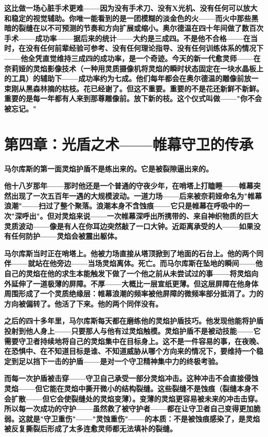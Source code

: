 \documentclass[12pt,a4paper,openany]{ctexbook}
\begin{document}
\textbf{这比做一场心脏手术更难——因为没有手术刀、没有X光机、没有任何可以放大和稳定的视觉辅助。你唯一能看到的是一团模糊的淡金色的火——而火中那些黑暗的裂缝在以不可预测的节奏和方向扩展或缩小。奥尔德温在四十年间做了数百次手术——成功率——据后来的统计——大约是三成四。不是他不合格——在当时，在没有任何前辈经验可参考、没有任何理论指导、没有任何训练体系的情况下——他全凭直觉维持三成四的成功率，是一个奇迹。今天的新一代愈灵师——在奈莉娅的灵焰影像技术（一种用灵质摄像机将灵焰的瞬时状态固定在一块水晶板上的工具）的辅助下——成功率约为七成。他们每年都会在奥尔德温的雕像前放一束刚从黑森林摘的枯枝。花已经谢了。但这不重要。重要的不是花还新鲜不新鲜。重要的是每一年都有人来到那尊雕像前。放下新的枝。这个仪式叫做——"你不会被忘记。"}


\section*{第四章：光盾之术——帷幕守卫的传承}


\textbf{马尔库斯的第一面灵焰护盾不是练出来的。它是被裂隙逼出来的。}


\textbf{他十八岁那年——那时他还是一个普通的守夜少年，在哨塔上打瞌睡——帷幕突然出现了一次五百年一遇的大规模波动。一道力场——后来被奈莉娅命名为"帷幕浪潮"——扫过了整个聚落。浪潮本身不含蚀痕——它只是帷幕在呼吸中的一次"深呼出"。但对灵焰来说——一次帷幕深呼出所携带的、来自神织物质的巨大灵质波动——像是有人在你耳边突然敲了一口大钟。近距离承受的人——如果没有任何防护——灵焰会被震出躯体。}


\textbf{马尔库斯当时正在哨塔上。他被力场直接从塔顶掀到了地面的石台上。他的两个同伴——就站在他旁边——当场灵焰离体。死亡。而马尔库斯在坠地的瞬间——他自己的灵焰在他的求生本能触发下做了一个他之前从未尝试过的事——将灵焰向外延伸了一道极薄的屏障。不厚——大概比一层宣纸更薄。但这层屏障在他身体周围形成了一个灵质绝缘层：帷幕浪潮的频率被他屏障的微频率部分抵消了。力的方向被偏转了。他活了下来。他的两个同伴没有。}


\textbf{之后的四十多年里，马尔库斯每天都在磨练他的灵焰护盾技巧。他发现他能将护盾投射到他人身上——只要那人与他有过灵焰触模。灵焰护盾不是被动技能——它需要守卫者持续地将自己的灵焰集中在目标身上。这不是一件容易的事，在夜晚、在恐惧中、在不知道目标是谁、不知道威胁从哪个方向来的情况下，要维持一个稳定到足以挡下一击的护盾——是对一个守卫精神集中力的终极考验。}


\textbf{而每一次护盾被击穿——守卫自己承受一部分灵焰冲击。这种冲击不会直接侵蚀灵焰——但它能在灵焰中撕开微小的结构裂缝。这些裂缝不是蚀痕（裂缝本身不会扩散——但它会使裂缝处的灵焰变薄）。变薄的灵焰更容易被未来的冲击击穿。所以每一次成功的守护——虽然救了被守护者——都在让守卫者自己变得更加脆弱。这就是"守卫重伤"——"灵蚀重伤"——的本质：不是被蚀痕感染了，是灵焰被反复撕裂后形成了太多连愈灵师都无法填补的裂缝。}
\end{document}
